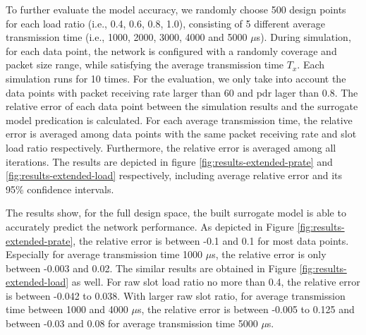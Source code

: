 To further evaluate the model accuracy, we randomly choose 500 design points for each load ratio (i.e., 0.4, 0.6, 0.8, 1.0), consisting of 5 different average transmission time (i.e., 1000, 2000, 3000, 4000 and 5000 $\mu$s). During simulation, for each data point, the network is configured with a randomly coverage and packet size range, while satisfying the average transmission time $T_x$. Each simulation runs for 10 times. For the evaluation, we only take into account the data points with packet receiving rate larger than 60 and \gls{pdr} lager than 0.8. The relative error of each data point between the simulation results and the surrogate model predication is calculated. For each average transmission time, the relative error is averaged among data points with the same packet receiving rate and slot load ratio respectively. Furthermore, the relative error is averaged among all iterations. The results are depicted in figure \ref{fig:results-extended-prate} and \ref{fig:results-extended-load} respectively, including  average relative error and its 95\% confidence intervals. 



The results show, for the full design space, the built surrogate model is able to accurately predict the network performance. As depicted in Figure \ref{fig:results-extended-prate}, the relative error is between -0.1 and 0.1 for most data points. Especially for average transmission time 1000 $\mu$s, the relative error is only between -0.003 and 0.02. The similar results are obtained in Figure \ref{fig:results-extended-load} as well. For \gls{raw} slot load ratio no more than 0.4, the relative error is between -0.042 to 0.038. With larger \gls{raw} slot ratio, for average transmission time between 1000 and 4000 $\mu$s, the relative error is between -0.005 to 0.125 and  between -0.03 and 0.08 for average transmission time 5000 $\mu$s.


